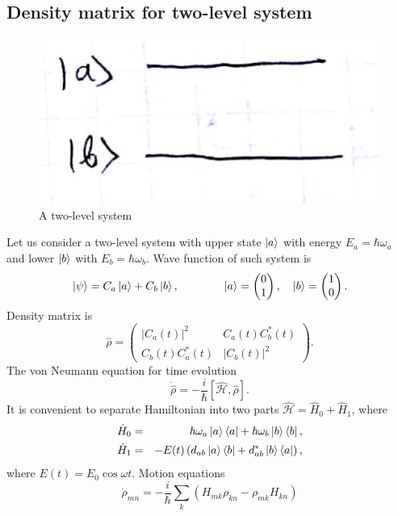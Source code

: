 \subsection{Density matrix for two-level system}

\begin{figure}[h!]
	\centering
	\includegraphics[width=0.25\linewidth]{fig/L4/2lvl}
	\caption{A two-level system}
	\label{fig:2lvl5}
\end{figure}

Let us consider a two-level system with upper state $\left\lvert {a} \right\rangle$ with energy $E_a = \hbar \omega_a$ and lower $\left\lvert {b} \right\rangle$ with $E_b = \hbar \omega_b$. Wave function of such system is
\begin{equation}
	\left\lvert {\psi} \right\rangle = C_a \left\lvert {a} \right\rangle + C_b \left\lvert {b} \right\rangle, \qquad \qquad
	\left\lvert {a} \right\rangle =
	\begin{pmatrix}
		0\\1
	\end{pmatrix}, \quad
	\left\lvert {b} \right\rangle =
	\begin{pmatrix}
	1\\0
	\end{pmatrix}.
\end{equation}
Density matrix is
\begin{equation}
	\hat{\rho} =
	\begin{pmatrix}
	\left| C_a (t) \right|^2 & C_a (t) C_b^*(t) \\
	C_b (t) C_a^*(t) & \left| C_b (t) \right|^2
	\end{pmatrix}.
\end{equation}
The von Neumann equation for time evolution
\begin{equation}
	\dot{\hat{\rho}} = - \frac{i}{\hbar} \left[ \hat{\mathscr{H}}, \hat{\rho} \right].
	\label{eq:vonN}
\end{equation}
It is convenient to separate Hamiltonian into two parts $\hat{\mathscr{H}} = \hat{H}_0 + \hat{H}_1$, where
\begin{eqnarray}
	\hat{H}_0 &=& \hbar \omega_a \left\lvert {a} \right\rangle \left\langle {a} \right\rvert + \hbar \omega_b \left\lvert {b} \right\rangle \left\langle {b} \right\rvert , \\
	\hat{H}_1 &=& -E(t) \left( d_{ab} \left\lvert {a} \right\rangle \left\langle {b} \right\rvert + d^*_{ab} \left\lvert {b} \right\rangle \left\langle {a} \right\rvert \right),
\end{eqnarray}
where $E(t) = E_0 \cos \omega t$. Motion equations
\begin{equation}
	\dot{\rho}_{mn} = - \frac{i}{\hbar} \sum_k \left( H_{mk} \rho_{kn} - \rho_{mk} H_{kn} \right)
\end{equation}
